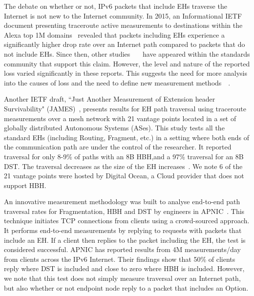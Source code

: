 \documentclass[conference]{IEEEtran}
\begin{document}
The debate on whether or not, IPv6 packets that include EHs traverse the Internet is not new to the Internet community.
In 2015, an Informational IETF document presenting traceroute active
measurements to destinations within the Alexa top 1M domains~\cite{RFC7872}
revealed that packets including EHs experience a significantly higher drop rate over an
Internet path compared to packets that do not include EHs. Since then, other
studies~\cite{james}~\cite{nalini-iepg114}~\cite{apnic} have appeared within the standards community that support this claim.  However,
the level and nature of the reported loss varied significantly in these
reports.  This suggests the need for more analysis into the causes of loss and the need to define new measurement methods~\cite{james}~\cite{elkins-v6ops-eh-deepdive-fw-01}.  


Another IETF draft, ``Just Another Measurement of Extension header
Survivability" (JAMES)~\cite{james}, presents results for EH path traversal using
traceroute measurements over a mesh network with 21 vantage points located in a set of globally distributed Autonomous Systems (ASes). This study tests all the standard EHs
(including Routing, Fragment, etc.) in a setting where both ends of the
communication path are under the control of the researcher.  It reported traversal for
 only 8-9\% of paths with an 8B HBH,and a 97\% traversal for an 8B
DST. The traversal decreases as the size of the EH
increases~\cite{james-imc}.  We note 6 of the 21 vantage points were
hosted by Digital Ocean\texttrademark, a Cloud provider that does not support
HBH.

An innovative measurement methodology was built to analyse end-to-end path traversal
rates for Fragmentation, HBH and DST by engineers in APNIC~\cite{apnic}.  This technique initiates TCP connections from clients using a crowd-sourced approach. It performs 
end-to-end measurements by replying to requests with packets that include an EH. If a client then replies to the packet including the EH, the test is considered successful.  
APNIC has reported results from 4M measurements/day from clients across the IPv6 Internet. 
Their findings show that 50\%  of clients reply where DST is included and close to zero where HBH is included.
However, we note that this test does not simply measure traversal over an Internet path, but also whether or not endpoint node reply to a packet that includes an Option. 
\end{document}
